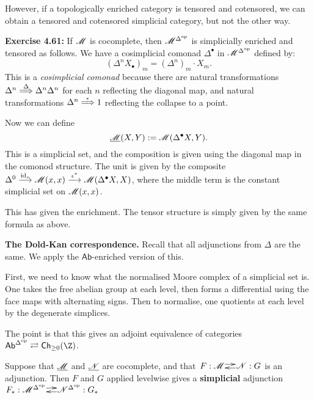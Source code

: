 \documentclass[11pt]{article}
\begin{document}
\begin{4. Basic concepts in enriched category theory}
\begin{itemise}
However, if a topologically enriched category is tensored and cotensored, we can obtain a tensored and cotensored simplicial category, but not the other way.
\item \textbf{Exercise 4.61:} If $\mathscr{M}$ is cocomplete, then $\mathscr{M}^{\Delta^{\textup{op}}}$ is simplicially enriched and tensored as follows. We have a cosimplicial comonad $\Delta^\bullet$ in $\mathscr{M}^{\Delta^{\textup{op}}}$ defined by:
\[(\Delta^nX_\bullet)_m=(\Delta^n)_m\cdot X_m.\]
This is a \emph{cosimplicial comonad} because there are natural transformations $\Delta^n\overset{\Delta}{\Longrightarrow} \Delta^n\Delta^n$ for each $n$ reflecting the diagonal map, and natural transformations $\Delta^n\overset{\epsilon}{\Longrightarrow} 1$ reflecting the collapse to a point.

Now we can define
\[\underline{\mathscr{M}}(X,Y ):=\mathscr{M}(\Delta^\bullet X,Y).\]
This is a simplicial set, and the composition is given using the diagonal map in the comonod structure. The unit is given by the composite $\Delta^0\overset{\textup{id}_x}{\longrightarrow}\mathscr{M}(x,x)\overset{\epsilon^*}{\longrightarrow}\mathscr{M}(\Delta^\bullet X,X)$, where the middle term is the constant simplicial set on $\mathscr{M}(x,x)$.

This has given the enrichment. The tensor structure is simply given by the same formula as above.
\item \textbf{The Dold-Kan correspondence.} 
Recall that all adjunctions from $\Delta$ are the same. We apply the $\mathsf{Ab}$-enriched version of this.

First, we need to know what the normalised Moore complex of a simplicial set is. One takes the free abelian group at each level, then forms a differential using the face maps with alternating signs. Then to normalise, one quotients at each level by the degenerate simplices. 

The point is that this gives an adjoint equivalence of categories $\mathsf{Ab}^{\Delta^{\op}}\rightleftarrows \mathsf{Ch}_{\geq0}(\Z)$. 
\item Suppose that $\underline{\mathscr{M}}$ and $\underline{\mathscr{N}}$ are cocomplete, and that 
$\xymatrix@C=.41cm@1{
F:\scrM  \ar@<.6ex>[r]&
\scrN:G  \ar@<.4ex>[l]
}$
 is an adjunction. Then $F$ and $G$ applied levelwise gives a \textbf{simplicial} adjunction $\xymatrix@C=.41cm@1{
F_*:\scrM^{\Delta^{\op}}  \ar@<.6ex>[r]&
\scrN^{\Delta^{\op}}:G_*  \ar@<.4ex>[l]
}$
\end{itemise}

\end{4. Basic concepts in enriched category theory}
\end{document}
